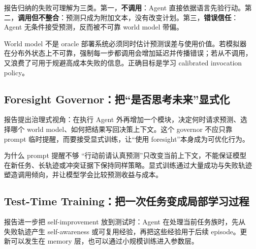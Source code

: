 
报告归纳的失败可理解为三类。第一，\textbf{不调用}：Agent 直接依据语言先验行动。第二，\textbf{调用但不整合}：预测只成为附加文本，没有改变计划。第三，\textbf{错误信任}：Agent 无条件接受预测，反而被不可靠 world model 带偏。

\begin{warningbox}{World model 不是 oracle}
部署系统必须同时估计预测误差与使用价值。若模拟器在分布外状态上不可靠，强制每一步都调用会增加延迟并传播错误；若从不调用，又浪费了可用于规避高成本失败的信息。正确目标是学习 calibrated invocation policy。
\end{warningbox}

\subsection{Foresight Governor：把“是否思考未来”显式化}

报告提出治理式视角：在执行 Agent 外再增加一个模块，决定何时请求预测、选择哪个 world model、如何把结果写回决策上下文。这个 governor 不应只靠 prompt 临时提醒，而要接受显式训练，让“使用 foresight”本身成为可优化行为。



\begin{knowledgebox}{为什么 prompt 提醒不够}
“行动前请认真预测”只改变当前上下文，不能保证模型在新任务、长轨迹或冲突证据下保持同样策略。显式训练通过大量成功与失败轨迹塑造调用倾向，并让模型学会比较预测收益与成本。
\end{knowledgebox}

\subsection{Test-Time Training：把一次任务变成局部学习过程}

报告进一步把 self-improvement 放到测试时：Agent 在处理当前任务族时，先从失败轨迹产生 self-awareness 或可复用经验，再把这些经验用于后续 episode。更新可以发生在 memory 层，也可以通过小规模训练进入参数层。



